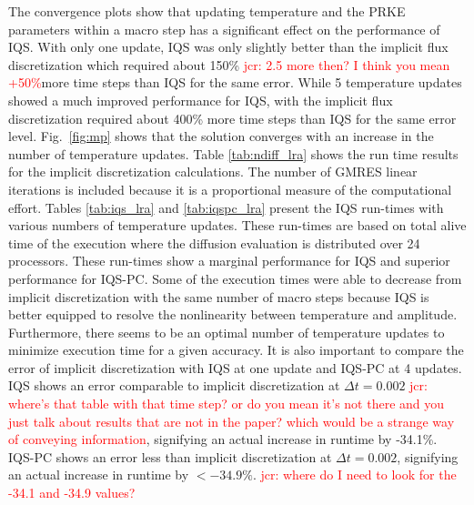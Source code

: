 \documentclass{elsarticle}
\newcommand{\fig}[1]{Fig.~\ref{#1}}                      %
\newcommand{\iqspc}{IQS-PC\xspace}
\newcommand{\jcr}[1]{\textcolor{red}{jcr: #1}}
\begin{document}
The convergence plots show that updating temperature and the PRKE parameters within a macro step has a significant effect on the performance of IQS.  With only one update, IQS was only slightly better than the implicit flux discretization which required about 150\% \jcr{2.5 more then? I think you mean +50\%}more time steps than IQS for the same error.  While 5 temperature updates showed a much improved performance for IQS, with the implicit flux discretization required about 400\% more time steps than IQS for the same error level.  \fig{fig:mp} shows that the solution converges with an increase in the number of temperature updates. 
%
Table \ref{tab:ndiff_lra} shows the run time results for the implicit discretization calculations. The number of GMRES linear iterations is included because it is a proportional measure of the computational effort. Tables \ref{tab:iqs_lra} and \ref{tab:iqspc_lra} present the IQS run-times with various numbers of temperature updates.  These run-times are based on total alive time of the execution where the diffusion evaluation is distributed over 24 processors. These run-times show a marginal performance for IQS and superior performance for \iqspc.  Some of the execution times were able to decrease from implicit discretization with the same number of macro steps because IQS is better equipped to resolve the nonlinearity between temperature and amplitude. Furthermore, there seems to be an optimal number of temperature updates to minimize execution time for a given accuracy.
It is also important to compare the error of implicit discretization with IQS at one update and \iqspc at 4 updates.  IQS shows an error comparable to implicit discretization at $\Delta t = 0.002$ \jcr{where's that table with that time step? or do you mean it's not there and you just talk about results that are not in the paper? which would be a strange way of conveying information}, signifying an actual increase in runtime by -34.1\%.  \iqspc shows an error less than implicit discretization at $\Delta t = 0.002$, signifying an actual increase in runtime by $<-34.9\%$. \jcr{where do I need to look for the -34.1 and -34.9 values?}
\end{document}
